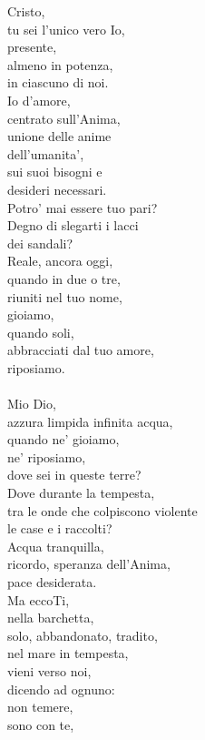 \begin{haiku}
Cristo,\\
tu sei l’unico vero Io,\\
presente,\\
    almeno in potenza,\\
    in ciascuno di noi.\\
Io d'amore,\\
    centrato sull’Anima,\\
unione delle anime\\
dell’umanita’,\\
sui suoi bisogni e\\
desideri necessari.\\
Potro' mai essere tuo pari?\\
Degno di slegarti i lacci\\
    dei sandali?\\
Reale, ancora oggi,\\
quando in due o tre,\\
riuniti nel tuo nome,\\
gioiamo,\\
quando soli,\\
abbracciati dal tuo amore,\\
riposiamo.\\
\leavevmode\\
Mio Dio,\\
azzura limpida infinita acqua,\\
quando ne' gioiamo,\\
ne' riposiamo,\\
dove sei in queste terre?\\
Dove durante la tempesta,\\
tra le onde che colpiscono violente\\
le case e i raccolti?\\
Acqua tranquilla,\\
ricordo, speranza dell'Anima,\\
pace desiderata.\\
Ma eccoTi,\\
nella barchetta,\\
solo, abbandonato, tradito,\\
nel mare in tempesta,\\
vieni verso noi,\\
dicendo ad ognuno:\\
non temere,\\
sono con te,\\

\end{haiku}
